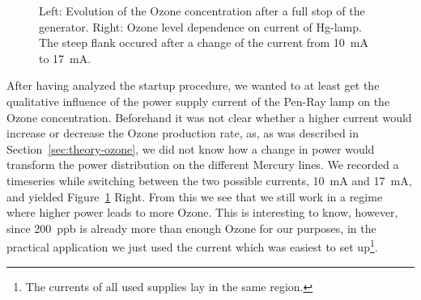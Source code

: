 \begin{figure}[htbp]
  \centering
  
  \hfill
  
  \caption{Left: Evolution of the Ozone concentration after a full stop of the
    generator. Right: Ozone level dependence on current of Hg-lamp. The steep
    flank occured after a change of the current from
    \SI{10}{\milli\ampere} to \SI{17}{\milli\ampere}.}
  \label{fig:multiple-stop}
\end{figure}

After having analyzed the startup procedure, we wanted to at least get
the qualitative influence of the power supply current of the Pen-Ray
lamp on the Ozone concentration. Beforehand it was not clear whether a
higher current would increase or decrease the Ozone production rate,
as, as was described in Section~\ref{sec:theory-ozone}, we did not
know how a change in power would transform the power distribution on
the different Mercury lines. We recorded a timeseries while switching
between the two possible currents, \SI{10}{\milli\ampere} and
\SI{17}{\milli\ampere}, and yielded 
Figure~\ref{fig:multiple-stop} Right. From this we see that we still work in a regime
where higher power leads to more Ozone. This is interesting to know,
however, since \SI{200}{ppb} is already more than enough Ozone for our
purposes, in the practical application we just used the current
which was easiest to set up\footnote{The currents of all used supplies
  lay in the same region.}.

